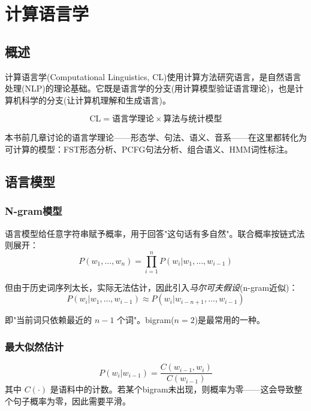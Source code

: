\clearpage
\vspace*{\fill}
\section{计算语言学}
\vspace*{\fill}
\clearpage


\subsection{概述}

计算语言学(Computational Linguistics, CL)使用计算方法研究语言，是自然语言处理(NLP)的理论基础。它既是语言学的分支(用计算模型验证语言理论)，也是计算机科学的分支(让计算机理解和生成语言)。

\begin{equation}
    \text{CL} = \text{语言学理论} \times \text{算法与统计模型}
\end{equation}

本书前几章讨论的语言学理论——形态学、句法、语义、音系——在这里都转化为可计算的模型：FST形态分析、PCFG句法分析、组合语义、HMM词性标注。

\subsection{语言模型}

\subsubsection{N-gram模型}

语言模型给任意字符串赋予概率，用于回答"这句话有多自然"。联合概率按链式法则展开：
\begin{equation}
    P(w_1, \ldots, w_n) = \prod_{i=1}^{n} P(w_i | w_1, \ldots, w_{i-1})
\end{equation}

但由于历史词序列太长，实际无法估计，因此引入\emph{马尔可夫假设}(n-gram近似)：
\begin{equation}
    P(w_i | w_1, \ldots, w_{i-1}) \approx P(w_i | w_{i-n+1}, \ldots, w_{i-1})
\end{equation}

即"当前词只依赖最近的 $n-1$ 个词"。bigram($n=2$)是最常用的一种。

\subsubsection{最大似然估计}

\begin{equation}
    P(w_i | w_{i-1}) = \frac{C(w_{i-1}, w_i)}{C(w_{i-1})}
\end{equation}
其中 $C(\cdot)$ 是语料中的计数。若某个bigram未出现，则概率为零——这会导致整个句子概率为零，因此需要平滑。

